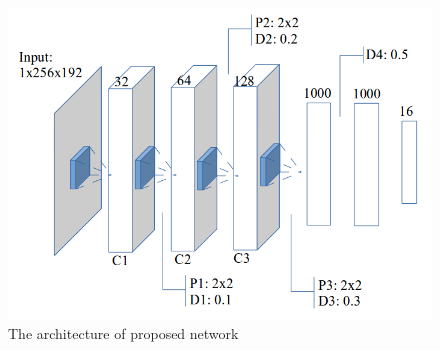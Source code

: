 \documentclass[conference]{IEEEtran}
\begin{document}

\begin{figure}[htbp]
	\centerline{\includegraphics[scale=0.3]{images/architecture}}
	\caption{The architecture of proposed network}
	\label{figarch}
\end{figure}
\end{document}

